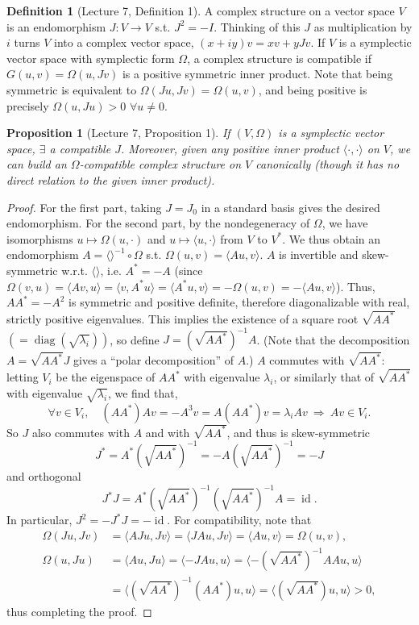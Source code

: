 \documentclass[UTF8,11pt]{ctexart}
\newtheorem*{proposition}{Proposition}
\theoremstyle{definition}
\newtheorem*{definition}{Definition}
\DeclareMathOperator{\id}{id}
\begin{document}
\begin{definition}[Lecture 7, Definition 1]
A complex structure on a vector space $V$ is an endomorphism $J:V\to V$ s.t. $J^2=-I$. Thinking of this $J$ as multiplication by $i$ turns $V$ into a complex vector space, $(x+iy)v=xv+yJv$. If $V$ is a symplectic vector space with symplectic form $\Omega$, a complex structure is compatible if $G(u,v)=\Omega(u,Jv)$ is a positive symmetric inner product. Note that being symmetric is equivalent to $\Omega(Ju,Jv)=\Omega(u,v)$, and being positive is precisely $\Omega(u,Ju)>0$ $\forall u\ne0$.
\end{definition}
\begin{proposition}[Lecture 7, Proposition 1]
If $(V,\Omega)$ is a symplectic vector space, $\exists$ a compatible $J$. Moreover, given any positive inner product $\langle\cdot,\cdot\rangle$ on $V$, we can build an $\Omega$-compatible complex structure on $V$ canonically (though it has no direct relation to the given inner product).
\end{proposition}
\begin{proof}
For the first part, taking $J=J_0$ in a standard basis gives the desired endomorphism. For the second part, by the nondegeneracy of $\Omega$, we have isomorphisms $u\mapsto\Omega(u,\cdot)$ and $u\mapsto\langle u,\cdot\rangle$ from $V$ to $V^*$. We thus obtain an endomorphism $A=\langle\rangle^{-1}\circ\Omega$ s.t. $\Omega(u,v)=\langle Au,v\rangle$. $A$ is invertible and skew-symmetric w.r.t. $\langle\rangle$, i.e. $A^*=-A$ (since $\Omega(v,u)=\langle Av,u\rangle=\langle v,A^*u\rangle=\langle A^*u,v\rangle=-\Omega(u,v)=-\langle Au,v\rangle$). Thus, $AA^*=-A^2$ is symmetric and positive definite, therefore diagonalizable with real, strictly positive eigenvalues. This implies the existence of a square root $\sqrt{AA^*}$ $(=\operatorname{diag}(\sqrt{\lambda_i}))$, so define $J=(\sqrt{AA^*})^{-1}A$. (Note that the decomposition $A=\sqrt{AA^*}J$ gives a ``polar decomposition'' of $A$.) $A$ commutes with $\sqrt{AA^*}$: letting $V_i$ be the eigenspace of $AA^*$ with eigenvalue $\lambda_i$, or similarly that of $\sqrt{AA^*}$ with eigenvalue $\sqrt{\lambda_i}$, we find that,
\[\forall v\in V_i,\quad(AA^*)Av=-A^3v=A(AA^*)v=\lambda_iAv\ \Longrightarrow\ Av\in V_i.\]
So $J$ also commutes with $A$ and with $\sqrt{AA^*}$, and thus is skew-symmetric
\[J^*=A^*(\sqrt{AA^*})^{-1}=-A(\sqrt{AA^*})^{-1}=-J\]
and orthogonal
\[J^*J=A^*(\sqrt{AA^*})^{-1}(\sqrt{AA^*})^{-1}A=\id.\]
In particular, $J^2=-J^*J=-\id$. For compatibility, note that
\begin{align*}
\Omega(Ju,Jv)&=\langle AJu,Jv\rangle=\langle JAu,Jv\rangle=\langle Au,v\rangle=\Omega(u,v),\\
\Omega(u,Ju)&=\langle Au,Ju\rangle=\langle-JAu,u\rangle
=\langle-(\sqrt{AA^*})^{-1}AAu,u\rangle\\
&=\langle(\sqrt{AA^*})^{-1}(AA^*)u,u\rangle=\langle(\sqrt{AA^*})u,u\rangle>0,
\end{align*}
thus completing the proof.
\end{proof}
\end{document}

